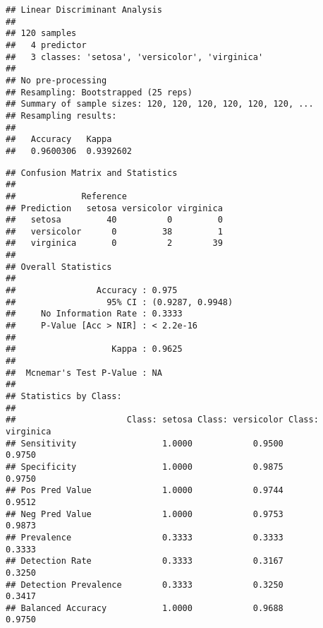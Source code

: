 \documentclass[
]{article}
\newenvironment{Shaded}{\begin{snugshade}}{\end{snugshade}}
\newcommand{\AttributeTok}[1]{\textcolor[rgb]{0.77,0.63,0.00}{#1}}
\newcommand{\CommentTok}[1]{\textcolor[rgb]{0.56,0.35,0.01}{\textit{#1}}}
\newcommand{\DecValTok}[1]{\textcolor[rgb]{0.00,0.00,0.81}{#1}}
\newcommand{\FunctionTok}[1]{\textcolor[rgb]{0.00,0.00,0.00}{#1}}
\newcommand{\NormalTok}[1]{#1}
\newcommand{\OtherTok}[1]{\textcolor[rgb]{0.56,0.35,0.01}{#1}}
\newcommand{\SpecialCharTok}[1]{\textcolor[rgb]{0.00,0.00,0.00}{#1}}
\begin{document}
\begin{verbatim}
## Linear Discriminant Analysis 
## 
## 120 samples
##   4 predictor
##   3 classes: 'setosa', 'versicolor', 'virginica' 
## 
## No pre-processing
## Resampling: Bootstrapped (25 reps) 
## Summary of sample sizes: 120, 120, 120, 120, 120, 120, ... 
## Resampling results:
## 
##   Accuracy   Kappa    
##   0.9600306  0.9392602
\end{verbatim}

\begin{Shaded}
\end{Shaded}

\begin{verbatim}
## Confusion Matrix and Statistics
## 
##             Reference
## Prediction   setosa versicolor virginica
##   setosa         40          0         0
##   versicolor      0         38         1
##   virginica       0          2        39
## 
## Overall Statistics
##                                           
##                Accuracy : 0.975           
##                  95% CI : (0.9287, 0.9948)
##     No Information Rate : 0.3333          
##     P-Value [Acc > NIR] : < 2.2e-16       
##                                           
##                   Kappa : 0.9625          
##                                           
##  Mcnemar's Test P-Value : NA              
## 
## Statistics by Class:
## 
##                      Class: setosa Class: versicolor Class: virginica
## Sensitivity                 1.0000            0.9500           0.9750
## Specificity                 1.0000            0.9875           0.9750
## Pos Pred Value              1.0000            0.9744           0.9512
## Neg Pred Value              1.0000            0.9753           0.9873
## Prevalence                  0.3333            0.3333           0.3333
## Detection Rate              0.3333            0.3167           0.3250
## Detection Prevalence        0.3333            0.3250           0.3417
## Balanced Accuracy           1.0000            0.9688           0.9750
\end{verbatim}
\end{document}

